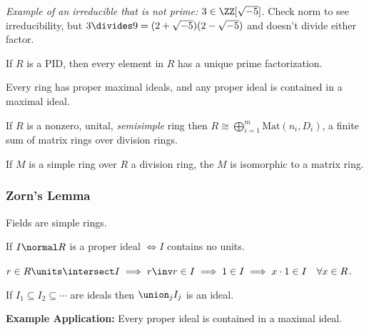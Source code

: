 \emph{Example of an irreducible that is not prime:}
\(3\in \ZZ[\sqrt{-5}]\). Check norm to see irreducibility, but
\(3 \divides 9 = (2+\sqrt{-5})(2-\sqrt{-5})\) and doesn't divide either
factor.

\begin{description}
\tightlist
\item[Lemma]
If \(R\) is a PID, then every element in \(R\) has a unique prime
factorization.
\item[Theorem (Krull)]
Every ring has proper maximal ideals, and any proper ideal is contained
in a maximal ideal.
\item[Theorem (Artin-Wedderubrn)]
If \(R\) is a nonzero, unital, \emph{semisimple} ring then
\(R \cong \bigoplus_{i=1}^m \mathrm{Mat}(n_i, D_i)\), a finite sum of
matrix rings over division rings.
\item[Corollary]
If \(M\) is a simple ring over \(R\) a division ring, the \(M\) is
isomorphic to a matrix ring.
\end{description}

\hypertarget{zorns-lemma}{%
\subsubsection{Zorn's Lemma}\label{zorns-lemma}}

\begin{description}
\tightlist
\item[Lemma]
Fields are simple rings.
\item[Lemma]
If \(I\normal R\) is a proper ideal \(\iff I\) contains no units.
\item[Proof]
\(r\in R\units \intersect I \implies r\inv r \in I \implies 1\in I \implies x\cdot 1 \in I \quad \forall x\in R\).
\item[Lemma]
If \(I_1 \subseteq I_2 \subseteq \cdots\) are ideals then
\(\union_j I_j\) is an ideal.
\end{description}

\textbf{Example Application:} Every proper ideal is contained in a
maximal ideal.

